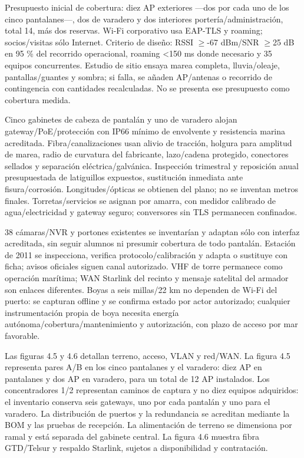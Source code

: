 \documentclass[11pt,letterpaper]{report}
\begin{document}
Presupuesto inicial de cobertura: diez AP exteriores ---dos por cada uno de los cinco pantalanes---, dos de varadero y dos interiores portería/administración, total 14, más dos reservas. Wi-Fi corporativo usa EAP-TLS y roaming; socios/visitas sólo Internet. Criterio de diseño: RSSI $\geq$-67 dBm/SNR $\geq$25 dB en 95 \% del recorrido operacional, roaming <150 ms donde necesario y 35 equipos concurrentes. Estudio de sitio ensaya marea completa, lluvia/oleaje, pantallas/guantes y sombra; si falla, se añaden AP/antenas o recorrido de contingencia con cantidades recalculadas. No se presenta ese presupuesto como cobertura medida.

Cinco gabinetes de cabeza de pantalán y uno de varadero alojan gateway/PoE/protección con IP66 mínimo de envolvente y resistencia marina acreditada. Fibra/canalizaciones usan alivio de tracción, holgura para amplitud de marea, radio de curvatura del fabricante, lazo/cadena protegido, conectores sellados y separación eléctrica/galvánica. Inspección trimestral y reposición anual presupuestada de latiguillos expuestos, sustitución inmediata ante fisura/corrosión. Longitudes/ópticas se obtienen del plano; no se inventan metros finales. Torretas/servicios se asignan por amarra, con medidor calibrado de agua/electricidad y gateway seguro; conversores sin TLS permanecen confinados.

38 cámaras/NVR y portones existentes se inventarían y adaptan sólo con interfaz acreditada, sin seguir alumnos ni presumir cobertura de todo pantalán. Estación de 2011 se inspecciona, verifica protocolo/calibración y adapta o sustituye con ficha; avisos oficiales siguen canal autorizado. VHF de torre permanece como operación marítima; WAN Starlink del recinto y mensaje satelital del armador son enlaces diferentes. Boyas a seis millas/22 km no dependen de Wi-Fi del puerto: se capturan offline y se confirma estado por actor autorizado; cualquier instrumentación propia de boya necesita energía autónoma/cobertura/mantenimiento y autorización, con plazo de acceso por mar favorable.

Las figuras 4.5 y 4.6 detallan terreno, acceso, VLAN y red/WAN. La figura 4.5 representa pares A/B en los cinco pantalanes y el varadero: diez AP en pantalanes y dos AP en varadero, para un total de 12 AP instalados. Los concentradores 1/2 representan caminos de captura y no diez equipos adquiridos: el inventario conserva seis gateways, uno por cada pantalán y uno para el varadero. La distribución de puertos y la redundancia se acreditan mediante la BOM y las pruebas de recepción. La alimentación de terreno se dimensiona por ramal y está separada del gabinete central. La figura 4.6 muestra fibra GTD/Telsur y respaldo Starlink, sujetos a disponibilidad y contratación.
\end{document}
